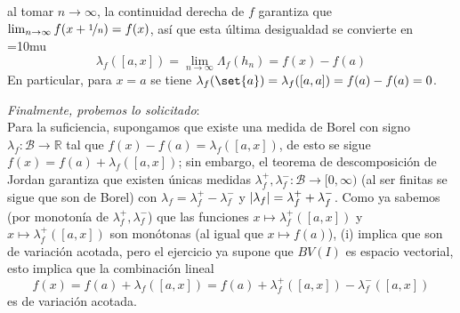 \begin{sol}
\begin{enumerate}[label=(\roman*),leftmargin=1.8em]
{\[\]
}
al tomar $n\to\infty$, la continuidad derecha de $f$ garantiza que $\lim_{n\to\infty}f(x+\nicefrac{1}{n}) = f(x)$, así que esta última desigualdad se convierte en
{\thickmuskip=10mu
\[
\lambda_f([a,x]) = \lim_{n\to\infty} \Lambda_f(h_n) = f(x) - f(a)
\]
}
En particular, para $x=a$ se tiene $\lambda_f(\set{a}) = \lambda_f([a,a]) = f(a)-f(a) = 0$.\par
\medskip
\emph{Finalmente, probemos lo solicitado}:\\
Para la suficiencia, supongamos que existe una medida de Borel con signo $\lambda_f\colon \mathcal{B} \to \mathbb{R}$ tal que $f(x)-f(a) = \lambda_f([a,x])$, de esto se sigue $f(x) = f(a) + \lambda_f([a,x])$; sin embargo, el teorema de descomposición de Jordan garantiza que existen únicas medidas $\lambda^+_f,\lambda^-_f\colon \mathcal{B} \to [0,\infty)$ (al ser finitas se sigue que son de Borel) con $\lambda_f = \lambda^+_f - \lambda^-_f$ y $\abs{\lambda_f}=\lambda^+_f + \lambda^-_f$. Como ya sabemos (por monotonía de $\lambda^+_f,\lambda^-_f$) que las funciones $x\mapsto\lambda^+_f([a,x])$ y $x \mapsto \lambda^+_f([a,x])$ son monótonas (al igual que $x\mapsto f(a)$), (i) implica que son de variación acotada, pero el ejercicio ya supone que $BV(I)$ es espacio vectorial, esto implica que la combinación lineal
\[
f(x) = f(a) + \lambda_f([a,x]) = f(a) + \lambda^+_f([a,x]) -\lambda^-_f([a,x])
\]
es de variación acotada.\par


\end{enumerate}
\end{sol}
